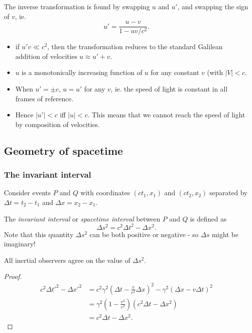 \documentclass[a4paper]{article}
\begin{document}
The inverse transformation is found by swapping $u$ and $u'$, and swapping the sign of $v$, ie.
\[
  u' = \frac{u - v}{1 - uv/c^2}.
\]
\note
\begin{itemize}
  \item if $u'v \ll c^2$, then the transformation reduces to the standard Galilean addition of velocities $u \approx u' + v$.
  \item $u$ is a monotonically increasing function of $u$ for any constant $v$ (with $|V| < c$.
  \item When $u' = \pm c$, $u = u'$ for any $v$, ie. the speed of light is constant in all frames of reference.
  \item Hence $|u'| < c$ iff $|u| < c$. This means that we cannot reach the speed of light by composition of velocities.
\end{itemize}

\subsection{Geometry of spacetime}
\subsubsection{The invariant interval}
Consider events $P$ and $Q$ with coordinates $(ct_1, x_1)$ and $(ct_2, x_2)$ separated by $\Delta t = t_2 - t_1$ and $\Delta x = x_2 - x_1$.

\begin{defi}
  The \emph{invariant interval} or \emph{spacetime interval} between $P$ and $Q$ is defined as
  \[
    \Delta s^2 = c^2 \Delta t^2 - \Delta x^2.
  \]
  Note that this quantity $\Delta s^2$ can be both positive or negative - so $\Delta s$ might be imaginary!
\end{defi}

\begin{prop}
  All inertial observers agree on the value of $\Delta s^2$.
\end{prop}

\begin{proof}
  \begin{align*}
    c^2 \Delta t'^2 - \Delta x'^2 &= c^2 \gamma^2 \left(\Delta t - \frac{v}{c^2}\Delta x\right)^2 - \gamma^2 (\Delta x - v\Delta t)^2\\
    &= \gamma^2 \left(1 - \frac{v^2}{c^2}\right)(c^2 \Delta t - \Delta x^2)\\
    &= c^2\Delta t - \Delta x^2.
  \end{align*}
\end{proof}
\end{document}
